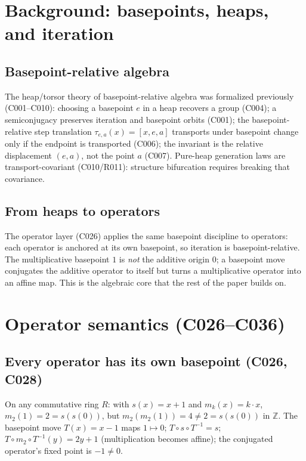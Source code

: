 \documentclass[sigplan,10pt,anonymous,review]{acmart}
\begin{document}
\section{Background: basepoints, heaps, and iteration}

\subsection{Basepoint-relative algebra}

The heap/torsor theory of basepoint-relative algebra was formalized previously
(C001--C010): choosing a basepoint $e$ in a heap recovers a group (C004); a
semiconjugacy preserves iteration and basepoint orbits (C001); the basepoint-relative
step translation $\tau_{e,a}(x) = [x,e,a]$ transports under basepoint change only
if the endpoint is transported (C006); the invariant is the relative displacement
$(e,a)$, not the point $a$ (C007). Pure-heap generation laws are
transport-covariant (C010/R011): structure bifurcation requires breaking that
covariance.

\subsection{From heaps to operators}

The operator layer (C026) applies the same basepoint discipline to operators:
each operator is anchored at its own basepoint, so iteration is
basepoint-relative. The multiplicative basepoint $1$ is \emph{not} the additive
origin $0$; a basepoint move conjugates the additive operator to itself but
turns a multiplicative operator into an affine map. This is the algebraic core
that the rest of the paper builds on.

\section{Operator semantics (C026--C036)}

\subsection{Every operator has its own basepoint (C026, C028)}

\begin{theorem}[C026]
On any commutative ring $R$: with $s(x) = x+1$ and $m_k(x) = k\cdot x$,
$m_2(1) = 2 = s(s(0))$, but $m_2(m_2(1)) = 4 \ne 2 = s(s(0))$ in $\mathbb Z$.
The basepoint move $T(x) = x-1$ maps $1 \mapsto 0$; $T\circ s \circ T^{-1} = s$;
$T\circ m_2 \circ T^{-1}(y) = 2y + 1$ (multiplication becomes affine); the
conjugated operator's fixed point is $-1 \ne 0$.
\end{theorem}
\end{document}
